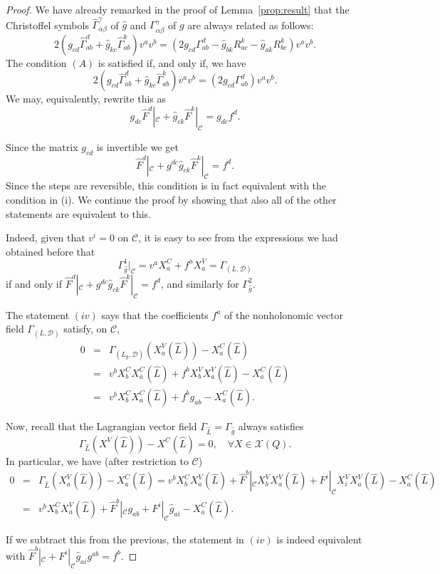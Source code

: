 \documentclass[11pt]{article}
\def\C{{\mathcal C}}
\def\GLD{{\Gamma_{(L,\mathcal{D})}}}
\begin{document}
\begin{proof}  We have already remarked in the proof of Lemma~\ref{prop:result} that the Christoffel symbols ${\hat\Gamma}^\gamma_{\alpha\beta}$ of $\hat g$ and $\Gamma^\gamma_{\alpha\beta}$ of $g$ are always related as follows: 
$$
2({g}_{c d} \hat{\Gamma}_{a b}^d+\hat{g}_{kc}\hat{\Gamma}^k_{ab})v^a v^b =(2{g}_{c d} {\Gamma}_{a b}^d-\hat{g}_{bk}R^k_{ac}-\hat{g}_{ak}R^k_{bc}) v^av^b.
$$ 
The condition $(A)$ is satisfied if, and only if, we have
$$
2({g}_{c d} \hat{\Gamma}_{a b}^d+\hat{g}_{kc}\hat{\Gamma}^k_{ab})v^a v^b =(2{g}_{c d} {\Gamma}_{a b}^d) v^av^b.
$$
We may, equivalently, rewrite this as 
$$
g_{dc}\hat{F}^d|_{\C}+\hat{g}_{ck}\hat{F}^k|_{\C}=g_{dc}f^d.
$$


Since the matrix $g_{cd}$ is invertible we get 
$$
\hat{F}^d|_{\C}+g^{dc}\hat{g}_{ck}\hat{F}^k|_{\C}=f^d .
$$
Since the steps are reversible, this condition is in fact equivalent with the condition in (i). We continue the proof by showing that also all of the other statements are equivalent to this.

Indeed, given that $v^i=0$ on $\C$, it is easy to see from the expressions we had obtained before  that  
\[
\Gamma_{\hat{g}}^1|_\C= v^a X_a^C+ f^a X_a^V=\GLD
\]
if and only if $
\hat{F}^d|_{\C}+g^{dc}\hat{g}_{ck}\hat{F}^k|_{\C}=f^d
$, and similarly for $\Gamma_{\hat{g}}^2$.


The statement $(iv)$ says that the coefficients $f^a$ of the nonholonomic vector field $\GLD$ satisfy, on $\mathcal{C}$, 
\begin{eqnarray*}
  0  &= &\Gamma_{(L_g,\mathcal{D})}(X_a^V(\hat{L}))-X_a^C(\hat{L})\\
    &=& v^b X_b^C X_a^C(\hat{L})+f^b X_b^V X_a^V(\hat{L})-X_a^C(\hat{L})\\
    &=& v^b X_b^C X_a^C(\hat{L})+f^b {g}_{ab}-X_a^C(\hat{L}).
\end{eqnarray*}




Now, recall that the Lagrangian vector field $\Gamma_{\hat{L}} = \Gamma_{\hat{g}} $ always satisfies
$$
\Gamma_{\hat{L}}(X^V(\hat{L}))-X^C(\hat{L})=0,\quad\forall X\in\mathcal{X}(Q).
$$
In particular, we have (after restriction to $\C$)
\begin{eqnarray*}
  0 & =&\Gamma_{\hat{L}}(X_a^V(\hat{L}))-X_a^C(\hat{L}) = v^bX_b^CX_a^V(\hat{L})+\hat{F}^b|_\mathcal{C}X_b^V X_a^V(\hat{L})+F^i|_{\mathcal{C}}X_i^V X_a^V(\hat{L})-X_a^C(\hat{L}) \\
    &=&v^bX_b^CX_a^V(\hat{L})+\hat{F}^b|_\mathcal{C}{g}_{ab}+F^i|_{\mathcal{C}}\hat{g}_{ai}-X_a^C(\hat{L}). 
\end{eqnarray*}


If we subtract this from the previous, the statement in $(iv)$ is indeed equivalent with $\hat{F}^b|_\mathcal{C}+F^i|_{\mathcal{C}}\hat{g}_{ai}g^{ab}=f^b$.
\end{proof}
\end{document}
